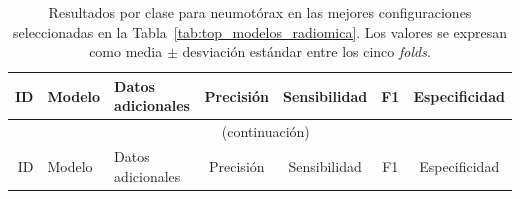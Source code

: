 \begin{landscape}
\begingroup
\scriptsize
\setlength{\tabcolsep}{3pt}

\begin{longtable}{rllcccc}
\caption{Resultados por clase para neumotórax en las mejores configuraciones seleccionadas en la Tabla~\ref{tab:top_modelos_radiomica}. Los valores se expresan como media $\pm$ desviación estándar entre los cinco \textit{folds}.}
\label{tab:radiomica_neumotorax}\\
\toprule
ID & Modelo & Datos adicionales & Precisión & Sensibilidad & F1 & Especificidad \\
\midrule
\endfirsthead

\multicolumn{7}{c}{\tablename\ \thetable{} (continuación)} \\
\toprule
ID & Modelo & Datos adicionales & Precisión & Sensibilidad & F1 & Especificidad \\
\midrule
\endhead


\end{longtable}
\end{landscape}
